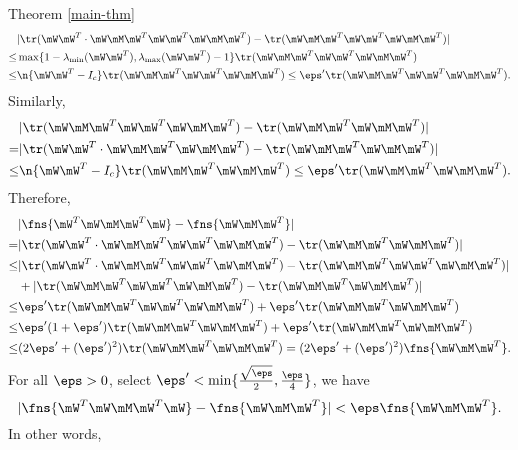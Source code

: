 \begin{proofof}{Theorem \cref{main-thm}}
\begin{equation}\begin{split}
    &|\tr(\mW\mW^T\cdot \mW\mM \mW^T\mW\mW^T\mW\mM \mW^T) - \tr(\mW\mM \mW^T\mW\mW^T\mW\mM \mW^T)| \\
    \leq& \max\{1-\lambda_{\min}(\mW\mW^T), \lambda_{\max}(\mW\mW^T)-1\}\tr(\mW\mM \mW^T\mW\mW^T\mW\mM \mW^T)\\
    \leq& \n{\mW\mW^T-I_c}\tr(\mW\mM \mW^T\mW\mW^T\mW\mM \mW^T)\leq\eps'\tr(\mW\mM \mW^T\mW\mW^T\mW\mM \mW^T).
\end{split}
\end{equation}
Similarly,
\begin{equation}\begin{split}
    &|\tr(\mW\mM \mW^T\mW\mW^T\mW\mM \mW^T) - \tr(\mW\mM \mW^T\mW\mM \mW^T)|\\
    =&|\tr(\mW\mW^T\cdot \mW\mM \mW^T\mW\mM \mW^T) - \tr(\mW\mM \mW^T\mW\mM \mW^T)|\\
    \leq&\n{\mW\mW^T-I_c}\tr(\mW\mM \mW^T\mW\mM \mW^T)\leq\eps'\tr(\mW\mM \mW^T\mW\mM \mW^T).
\end{split}\end{equation}
Therefore,
\begin{equation}\begin{split}
    &|\fns{\mW^T\mW\mM \mW^T\mW}-\fns{\mW\mM \mW^T}|\\
    =&|\tr(\mW\mW^T\cdot \mW\mM \mW^T\mW\mW^T\mW\mM \mW^T) - \tr(\mW\mM \mW^T\mW\mM \mW^T)| \\
    \leq&|\tr(\mW\mW^T\cdot \mW\mM \mW^T\mW\mW^T\mW\mM \mW^T) - \tr(\mW\mM \mW^T\mW\mW^T\mW\mM \mW^T)|\\
    &+|\tr(\mW\mM \mW^T\mW\mW^T\mW\mM \mW^T) - \tr(\mW\mM \mW^T\mW\mM \mW^T)|\\
    \leq&\eps'\tr(\mW\mM \mW^T\mW\mW^T\mW\mM \mW^T)+\eps'\tr(\mW\mM \mW^T\mW\mM \mW^T)\\
    \leq&\eps'(1+\eps')\tr(\mW\mM \mW^T\mW\mM \mW^T)+\eps'\tr(\mW\mM \mW^T\mW\mM \mW^T)\\
    \leq&(2\eps'+(\eps')^2)\tr(\mW\mM \mW^T\mW\mM \mW^T) = (2\eps'+(\eps')^2)\fns{\mW\mM \mW^T}.
\end{split}\end{equation}
For all $\eps>0$, select $\eps'<\min\{\frac{\sqrt{\eps}}{2},\frac{\eps}{4}\}$, we have
\begin{equation}
    |\fns{\mW^T\mW\mM \mW^T\mW}-\fns{\mW\mM \mW^T}|<\eps \fns{\mW\mM \mW^T}.
\end{equation}
In other words,
\begin{equation}

\end{equation}
\end{proofof}
